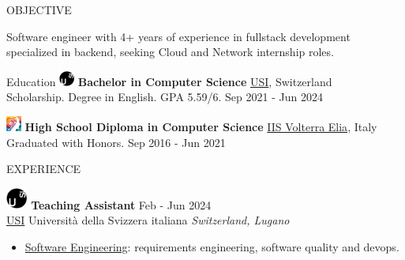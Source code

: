 \documentclass{cv} %
\def\intraexpvspace{0.15cm}
\begin{document}
\begin{minipage}[b][0.9\paperheight][t]{0.7\linewidth}

    \headline

\begin{rSection}{OBJECTIVE}
    \item Software engineer with 4+ years of experience in fullstack development specialized in backend, 
    seeking Cloud and Network internship roles.
\end{rSection}

\begin{rSection}{Education}
    \vspace{0.2cm}
    \includegraphics[width=0.5cm, trim={0cm 5cm 0cm 0cm}]{usi-icon.png}
    {\bf Bachelor in Computer Science}
    \hfill \href{https://www.usi.ch/en}{USI}, Switzerland\\
    Scholarship. Degree in English. GPA 5.59/6. 
    \hfill {Sep 2021 - Jun 2024} 
    \vspace{\intraexpvspace}
    \vspace{\intraexpvspace}

    \includegraphics[width=0.5cm, trim={0cm 1cm 0cm 0cm}]{iisve-icon.png}
    {\bf High School Diploma in Computer Science}
    \hfill \href{https://www.istitutovolterraelia.it/}{IIS Volterra Elia}, Italy \\
    Graduated with Honors.
    \hfill {Sep 2016 - Jun 2021} 
\end{rSection}
\begin{rSection}{EXPERIENCE}
    \vspace{0.2cm}

    \includegraphics[width=0.7cm, trim={0cm 10cm 0cm 0cm}]{usi-icon.png}
    \hspace*{0cm}\textbf{Teaching Assistant} \hfill Feb - Jun 2024\\
    \hspace*{0.85cm}\href{https://www.usi.ch/}{USI} Università della Svizzera italiana
    \hfill \textit{Switzerland, Lugano}
    \begin{itemize}
        \item \href{https://search.usi.ch/it/corsi/35268192/software-atelier-4-software-engineering-project}{Software Engineering}: 
        requirements engineering, software quality and devops.


\end{itemize}
\end{rSection}
\end{minipage}
\end{document}
